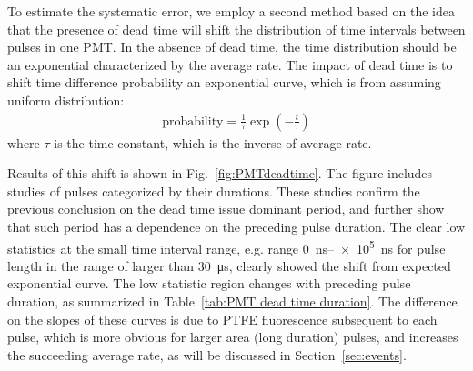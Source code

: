 To estimate the systematic error, we employ a second method based on the idea that the presence of dead time will shift the distribution of time intervals between pulses in one PMT. In the absence of dead time, the time distribution should be an exponential characterized by the average rate. The impact of dead time is to shift time difference probability an exponential curve, which is from assuming uniform distribution:
\begin{align}
	\text{probability} = \frac{1}{\tau}\exp \left( - \frac{t}{\tau} \right)
\end{align}
where $\tau$ is the time constant, which is the inverse of average rate. 

Results of this shift is shown in Fig.~\ref{fig:PMTdeadtime}. %
The figure includes studies of pulses categorized by their durations. These studies confirm the previous conclusion on the dead time issue dominant period, and further show that such period has a dependence on the preceding pulse duration. The clear low statistics at the small time interval range, e.g. range \SIrange{0}{e5}{\ns} for pulse length in the range of larger than \SI{30}{\us}, clearly showed the shift from expected exponential curve. The low statistic region changes with preceding pulse duration, as summarized in Table~\ref{tab:PMT dead time duration}. The difference on the slopes of these curves is due to PTFE fluorescence subsequent to each pulse, which is more obvious for larger area (long duration) pulses, and increases the succeeding average rate, as will be discussed in Section~\ref{sec:events}. 

